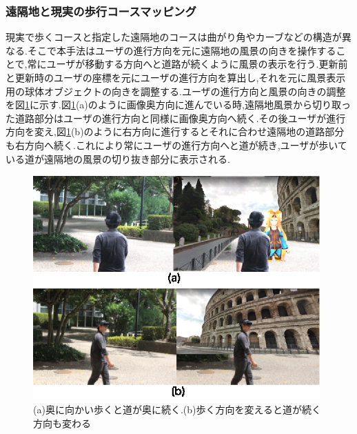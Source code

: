 \clearpage


\subsubsection{遠隔地と現実の歩行コースマッピング}
現実で歩くコースと指定した遠隔地のコースは曲がり角やカーブなどの構造が異なる.そこで本手法はユーザの進行方向を元に遠隔地の風景の向きを操作することで,常にユーザが移動する方向へと道路が続くように風景の表示を行う.更新前と更新時のユーザの座標を元にユーザの進行方向を算出し,それを元に風景表示用の球体オブジェクトの向きを調整する.ユーザの進行方向と風景の向きの調整を図\ref{figure:landscape_rotate}に示す.図\ref{figure:landscape_rotate}(a)のように画像奥方向に進んでいる時,遠隔地風景から切り取った道路部分はユーザの進行方向と同様に画像奥方向へ続く.その後ユーザが進行方向を変え,図\ref{figure:landscape_rotate}(b)のように右方向に進行するとそれに合わせ遠隔地の道路部分も右方向へ続く.これにより常にユーザの進行方向へと道が続き,ユーザが歩いている道が遠隔地の風景の切り抜き部分に表示される.

\begin{figure}[htbp]
\begin{center}
\includegraphics[width=11cm]{img/02_proposedmethod/user_dire.eps} 
\end{center}
\caption{(a)奥に向かい歩くと道が奥に続く.(b)歩く方向を変えると道が続く方向も変わる}
\label{figure:landscape_rotate}
\end{figure} 















